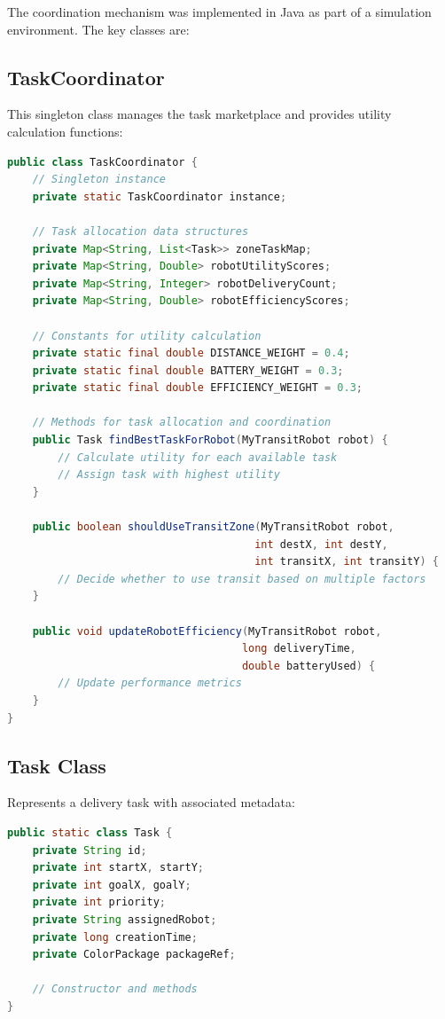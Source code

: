\documentclass[12pt,a4paper]{article}
\begin{document}
The coordination mechanism was implemented in Java as part of a simulation environment. The key classes are:

\subsection{TaskCoordinator}

This singleton class manages the task marketplace and provides utility calculation functions:

\begin{lstlisting}[language=Java, caption=TaskCoordinator Class]
public class TaskCoordinator {
    // Singleton instance
    private static TaskCoordinator instance;
    
    // Task allocation data structures
    private Map<String, List<Task>> zoneTaskMap;
    private Map<String, Double> robotUtilityScores;
    private Map<String, Integer> robotDeliveryCount;
    private Map<String, Double> robotEfficiencyScores;
    
    // Constants for utility calculation
    private static final double DISTANCE_WEIGHT = 0.4;
    private static final double BATTERY_WEIGHT = 0.3;
    private static final double EFFICIENCY_WEIGHT = 0.3;
    
    // Methods for task allocation and coordination
    public Task findBestTaskForRobot(MyTransitRobot robot) {
        // Calculate utility for each available task
        // Assign task with highest utility
    }
    
    public boolean shouldUseTransitZone(MyTransitRobot robot, 
                                       int destX, int destY, 
                                       int transitX, int transitY) {
        // Decide whether to use transit based on multiple factors
    }
    
    public void updateRobotEfficiency(MyTransitRobot robot, 
                                     long deliveryTime, 
                                     double batteryUsed) {
        // Update performance metrics
    }
}
\end{lstlisting}

\subsection{Task Class}

Represents a delivery task with associated metadata:

\begin{lstlisting}[language=Java, caption=Task Class]
public static class Task {
    private String id;
    private int startX, startY;
    private int goalX, goalY;
    private int priority;
    private String assignedRobot;
    private long creationTime;
    private ColorPackage packageRef;
    
    // Constructor and methods
}
\end{lstlisting}
\end{document}
